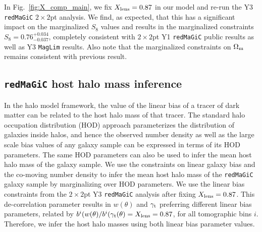 \documentclass[aps, prd,twocolumn,superscriptaddress,nofootinbib,preprintnumbers]{revtex4-1}
\newcommand{\redmagic}{\texttt{redMaGiC} }
\newcommand{\maglim}{\texttt{MagLim} }
\begin{document}
In Fig.~\ref{fig:X_comp_main}, we fix  $X_{\rm lens} = 0.87$ in our model and re-run the Y3 \redmagic $2\times2$pt analysis. We find, as expected, that this has a significant impact on the marginalized $S_8$ values and results in the marginalized constraints $S_8 = 0.76_{-0.037}^{+0.034}$, completely consistent with $2\times2$pt Y1 \redmagic public results as well as Y3 \maglim results. Also note that the marginalized constraints on $\Omega_{\rm m}$ remains consistent with previous result. 



\subsection{\redmagic host halo mass inference}

In the halo model framework, the value of the linear bias of a tracer of dark matter can be related to the host halo mass of that tracer. The standard halo occupation distribution (HOD) approach parameterizes the distribution of  galaxies inside  halos, and hence the observed number density as well as the large scale bias values of any galaxy sample can be expressed in terms of its HOD parameters. The same HOD parameters can also be used to infer the mean host halo mass of the galaxy sample. We use the constraints on  linear galaxy bias and the co-moving number density to infer the mean host halo mass of the \redmagic galaxy sample by marginalizing over HOD parameters. We use the linear bias constraints from the $2\times2$pt Y3 \redmagic analysis after fixing $X_{\rm lens}=0.87$. This de-correlation parameter results in $w(\theta)$ and $\gamma_{\rm t}$ preferring different linear bias parameters, related by $b^{i}(w(\theta)/b^{i}(\gamma_{\rm t}(\theta) = X_{\rm lens} = 0.87$, for all tomographic bins $i$. Therefore, we infer the host halo masses using both linear bias parameter values. 
\end{document}
